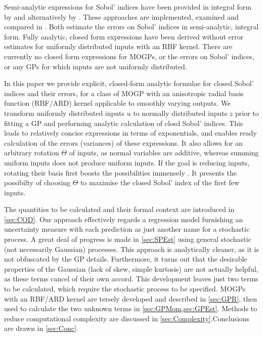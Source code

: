 \documentclass[preprint,12pt]{elsarticle}
\begin{document}
    Semi-analytic expressions for Sobol' indices have been provided in integral form by \cite{Oakley.OHagan2004} and alternatively by \cite{Chen.etal2005}. These approaches are implemented, examined and compared in \cite{Marrel.etal2009,Srivastava.etal2017}. Both \cite{Oakley.OHagan2004,Marrel.etal2009} estimate the errors on Sobol' indices in semi-analytic, integral form. Fully analytic, closed form expressions have been derived without error estimates for uniformly distributed inputs \cite{Wu.etal2016a} with an RBF kernel. There are currently no closed form expressions for MOGPs, or the errors on Sobol' indices, or any GPs for which inputs are not uniformly distributed. 

    In this paper we provide explicit, closed-form analytic formulae for closed Sobol' indices and their errors, for a class of MOGP with an anisotropic radial basis function (RBF/ARD) kernel applicable to smoothly varying outputs. 
    We transform uniformly distributed inputs $u$ to normally distributed inputs $z$ prior to fitting a GP and performing analytic calculation of closd Sobol' indices. This leads to relatively concise expressions in terms of exponentials, and enables ready calculation of the errors (variances) of these expressions. It also allows for an arbitrary rotation $\Theta$ of inputs, as normal variables are additive, whereas summing uniform inputs does not produce uniform inputs. If the goal is reducing inputs, rotating their basis first boosts the possibilities immensely \cite{Constantine2015}. It presents the possibilty of choosing $\Theta$ to maximise the closed Sobol' index of the first few inputs.

    The quantities to be calculated and their formal context are introduced in \cref{sec:COD}. Our approach effectively regards a regression model furnishing an uncertainty measure with each prediction as just another name for a stochastic process. A great deal of progress is made in \cref{sec:SPEst} using general stochastic (not necessarily Gaussian) processes. This approach is analytically cleaner, as it is not obfuscated by the GP details. Furthermore, it turns out that the desirable properties of the Gaussian (lack of skew, simple kurtosis) are not actually helpful, as these terms cancel of their own accord. This development leaves just two terms to be calculated, which require the stochastic process to be specified. MOGPs with an RBF/ARD kernel are tersely developed and described in \cref{sec:GPR}, then used to calculate the two unknown terms in \cref{sec:GPMom,sec:GPEst}. Methods to reduce computational complexity are discussed in \cref{sec:Complexity}.Conclusions are drawn in \cref{sec:Conc}.
\end{document}
